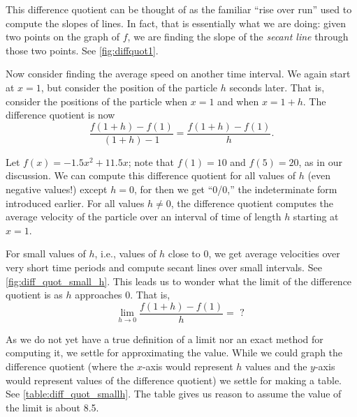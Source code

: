 This difference quotient can be thought of as the familiar ``rise over run'' used to compute the slopes of lines. In fact, that is essentially what we are doing: given two points on the graph of $f$, we are finding the slope of the \emph{secant line} through those two points. See \autoref{fig:diffquot1}.

Now consider finding the average speed on another time interval. We again start at $x=1$, but consider the position of the particle $h$ seconds later. That is, consider the positions of the particle when $x=1$ and when $x=1+h$. The difference quotient is now
\[\frac{f(1+h)-f(1)}{(1+h)-1} = \frac{f(1+h)-f(1)}h.\]

Let $f(x) = -1.5x^2+11.5x$; note that $f(1)=10$ and $f(5) = 20$, as in our discussion. We can compute this difference quotient for all values of $h$ (even negative values!) except $h=0$, for then we get ``0/0,'' the indeterminate form introduced earlier. For all values $h\neq 0$, the difference quotient computes the average velocity of the particle over an interval of time of length $h$ starting at $x=1$. 

For small values of $h$, i.e., values of $h$ close to 0, we get average velocities over very short time periods and compute secant lines over small intervals. See \autoref{fig:diff_quot_small_h}. This leads us to wonder what the limit of the difference quotient is as $h$ approaches 0. That is,\vspace{-.3\baselineskip}
\[\lim_{h\to 0} \frac{f(1+h)-f(1)}{h} = \text{ ? }\]

As we do not yet have a true definition of a limit nor an exact method for computing it, we settle for approximating the value. While we could graph the difference quotient (where the $x$-axis would represent $h$ values and the $y$-axis would represent values of the difference quotient) we settle for making a table. See \autoref{table:diff_quot_smallh}.
%
%
%
%
%
%
The table gives us reason to assume the value of the limit is about 8.5. \bigskip

